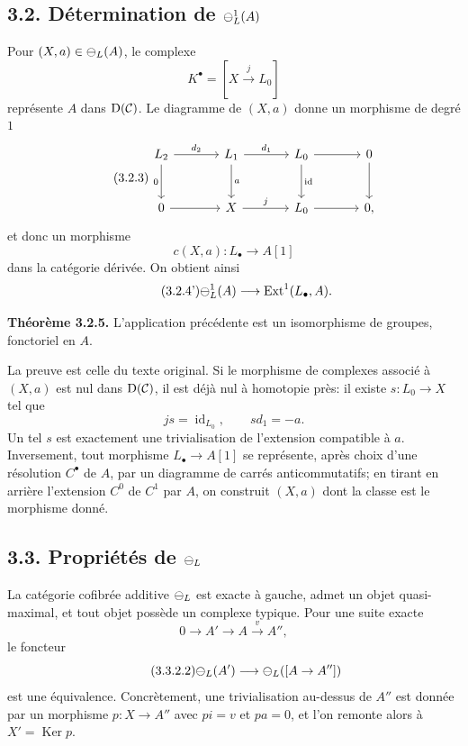 \documentclass[11pt]{article}
\providecommand{\Ker}{\operatorname{Ker}}
\providecommand{\Ext}{\operatorname{Ext}}
\providecommand{\id}{\operatorname{id}}
\begin{document}
\subsection*{3.2. D\'etermination de \(\mathcal\Psi_L^1(A)\)}
Pour \((X,a)\in\mathcal\Psi_L(A)\), le complexe
\begin{equation}\tag{3.2.1}
  K^\bullet=[X\xrightarrow{j}L_0]
\end{equation}
repr\'esente \(A\) dans \(\mathrm D(\mathcal C)\).  Le diagramme de \((X,a)\) donne un morphisme de degr\'e \(1\)
\begin{equation}\tag{3.2.3}
\begin{tikzcd}[column sep=large,row sep=large]
L_2\arrow[r,"d_2"]\arrow[d,"0"']&L_1\arrow[r,"d_1"]\arrow[d,"a"]&L_0\arrow[d,"\id"]\arrow[r]&0\arrow[d]\\
0\arrow[r]&X\arrow[r,"j"]&L_0\arrow[r]&0,
\end{tikzcd}
\end{equation}
et donc un morphisme
\begin{equation}\tag{3.2.4}
  c(X,a):L_\bullet\longrightarrow A[1]
\end{equation}
dans la cat\'egorie d\'eriv\'ee.  On obtient ainsi
\begin{equation}\tag{3.2.4'}
  \cPsi_L^1(A)\longrightarrow \Ext^1(L_\bullet,A).
\end{equation}

\textbf{Th\'eor\`eme 3.2.5.}  L'application pr\'ec\'edente est un isomorphisme de groupes, fonctoriel en \(A\).

La preuve est celle du texte original.  Si le morphisme de complexes associ\'e \`a \((X,a)\) est nul dans \(\mathrm D(\mathcal C)\), il est d\'ej\`a nul \`a homotopie pr\`es: il existe \(s:L_0\to X\) tel que
\begin{equation}\tag{3.2.5.1}
  js=\id_{L_0},\qquad s d_1=-a.
\end{equation}
Un tel \(s\) est exactement une trivialisation de l'extension compatible \`a \(a\).  Inversement, tout morphisme \(L_\bullet\to A[1]\) se repr\'esente, apr\`es choix d'une r\'esolution \(C^\bullet\) de \(A\), par un diagramme de carr\'es anticommutatifs; en tirant en arri\`ere l'extension \(C^0\) de \(C^1\) par \(A\), on construit \((X,a)\) dont la classe est le morphisme donn\'e.

\subsection*{3.3. Propri\'et\'es de \(\mathcal\Psi_L\)}
La cat\'egorie cofibr\'ee additive \(\mathcal\Psi_L\) est exacte \`a gauche, admet un objet quasi-maximal, et tout objet poss\`ede un complexe typique.  Pour une suite exacte
\begin{equation}\tag{3.3.2.1}
  0\to A'\to A\xrightarrow{v}A'',
\end{equation}
le foncteur
\begin{equation}\tag{3.3.2.2}
  \mathcal\Psi_L(A')\longrightarrow\mathcal\Psi_L([A\to A''])
\end{equation}
est une équivalence.  Concr\`etement, une trivialisation au-dessus de \(A''\) est donn\'ee par un morphisme \(p:X\to A''\) avec \(pi=v\) et \(pa=0\), et l'on remonte alors \`a \(X'=\Ker p\).
\end{document}
